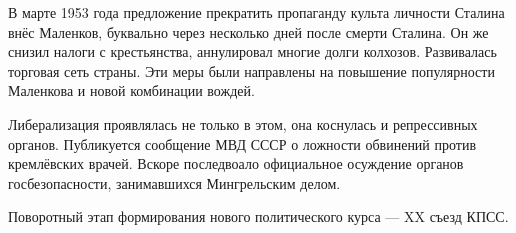 \documentclass{article}
\begin{document}
В марте 1953 года предложение прекратить пропаганду культа личности Сталина внёс Маленков, буквально через несколько дней после смерти Сталина. Он же снизил налоги с крестьянства, аннулировал многие долги колхозов. Развивалась торговая сеть страны. Эти меры были направлены на повышение популярности Маленкова и новой комбинации вождей.

Либерализация проявлялась не только в этом, она коснулась и репрессивных органов. Публикуется сообщение МВД СССР о ложности обвинений против кремлёвских врачей. Вскоре последвоало официальное осуждение органов госбезопасности, занимавшихся Мингрельским делом.

Поворотный этап формирования нового политического курса --- XX съезд КПСС.
\end{document}
